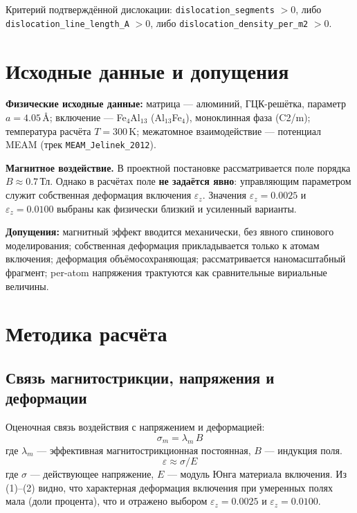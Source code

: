 \documentclass[14pt,a4paper]{extarticle}
\newcommand{\code}[1]{\texttt{#1}}
\begin{document}
Критерий подтверждённой дислокации: \code{dislocation\_segments} $> 0$, либо \code{dislocation\_line\_length\_A} $> 0$, либо \code{dislocation\_density\_per\_m2} $> 0$.

\section{Исходные данные и допущения}
\textbf{Физические исходные данные:} матрица — алюминий, ГЦК-решётка, параметр $a = 4.05$\,\AA; включение — Fe$_4$Al$_{13}$ (Al$_{13}$Fe$_4$), моноклинная фаза (C2/m); температура расчёта $T = 300$\,K; межатомное взаимодействие — потенциал MEAM (трек \code{MEAM\_Jelinek\_2012}).

\textbf{Магнитное воздействие.} В проектной постановке рассматривается поле порядка $B \approx 0.7$\,Тл. Однако в расчётах поле \textbf{не задаётся явно}: управляющим параметром служит собственная деформация включения $\varepsilon_z$. Значения $\varepsilon_z = 0.0025$ и $\varepsilon_z = 0.0100$ выбраны как физически близкий и усиленный варианты.

\textbf{Допущения:} магнитный эффект вводится механически, без явного спинового моделирования; собственная деформация прикладывается только к атомам включения; деформация объёмосохраняющая; рассматривается наномасштабный фрагмент; per-atom напряжения трактуются как сравнительные вириальные величины.

\section{Методика расчёта}
\subsection{Связь магнитострикции, напряжения и деформации}
Оценочная связь воздействия с напряжением и деформацией:
\begin{equation}
\sigma_m = \lambda_m \, B
\end{equation}
где $\lambda_m$ — эффективная магнитострикционная постоянная, $B$ — индукция поля.
\begin{equation}
\varepsilon \approx \sigma / E
\end{equation}
где $\sigma$ — действующее напряжение, $E$ — модуль Юнга материала включения. Из (1)–(2) видно, что характерная деформация включения при умеренных полях мала (доли процента), что и отражено выбором $\varepsilon_z = 0.0025$ и $\varepsilon_z = 0.0100$.
\end{document}

